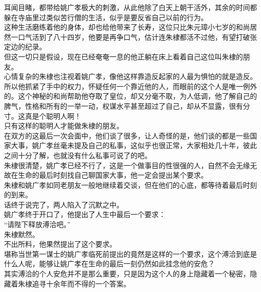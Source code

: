 \begin{multicols}{\theparacolNo}
耳闻目睹，都带给姚广孝极大的刺激，从此他除了白天上朝干活外，其余的时间都躲在寺庙里过类似苦行僧的生活，似乎是要反省自己以前的行为。\\

这种生活磨练着他的身体，却也给他带来了长寿，这位只比朱元璋小七岁的和尚居然一口气活到了八十四岁，他要是再争口气，估计连朱棣都活不过他，有望打破张定边的纪录。\\

但这一切只是假设，现在已经奄奄一息的他正躺在床上看着自己这位叫朱棣的朋友。\\

心情复杂的朱棣也注视着姚广孝，像他这样靠造反起家的人最为惧怕的就是造反。所以他抓紧了手中的权力，怀疑任何一个靠近他的人，而眼前的这个人是唯一例外的。这个神秘的和尚帮助他夺取了皇位，却又分毫不取，为人低调，他了解自己的脾气，性格和所有的一举一动，权谋水平甚至超过了自己，却从不显露，很有分寸。这真是个聪明人啊！\\

只有这样的聪明人才能做朱棣的朋友。\\

在双方的这最后一次会面中，他们谈了很多，让人奇怪的是，他们谈的都是一些国家大事，姚广孝丝毫未提及自己的私事，这似乎也很正常，大家相处几十年，彼此之间十分了解，也就没有什么私事可说了的吧。\\

朱棣很清楚，姚广孝已经不行了，这是一个做事目的性很强的人，自然不会无缘无故在生命的最后时刻找自己聊国家大事，他一定会提出某个要求。\\

朱棣和姚广孝如同老朋友一般地继续着交谈，但在他们的心底，都等待着最后时刻的到来。\\

话终于说完了，两人陷入了沉默之中。\\

姚广孝终于开口了，他提出了人生中最后一个要求：\\

“请陛下释放溥洽吧。”\\

朱棣默然。\\

不出所料，他果然提出了这个要求。\\

堪称当世第一谋士的姚广孝临死前提出的竟然是这样的一个要求，这个溥洽到底是什么人呢，能够让姚广孝在生命的最后一刻仍然如此挂念他的安危？\\

其实溥洽的个人安危并不是那么重要，只是因为这个人的身上隐藏着一个秘密，隐藏着朱棣追寻十余年而不得的一个答案。\\


\end{multicols}
